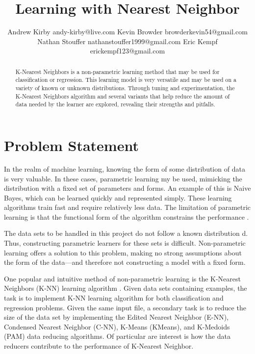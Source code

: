 \documentclass[twoside,11pt]{article}
\begin{document}
\title{Learning with Nearest Neighbor}

\author{\name Andrew Kirby \email andy-kirby@live.com \AND
		\name Kevin Browder \email browderkevin54@gmail.com \AND
		\name Nathan Stouffer \email nathanstouffer1999@gmail.com \AND
		\name Eric Kempf \email erickempf123@gmail.com }

\maketitle

\begin{abstract}
	K-Nearest Neighbors is a non-parametric learning method that may be used for classification or regression. This learning model is very versatile and may be used on a variety of known or unknown distributions. Through tuning and experimentation, the K-Nearest Neighbors algorithm and several variants that help reduce the amount of data needed by the learner are explored, revealing their strengths and pitfalls. 

\end{abstract}

\section{Problem Statement}

In the realm of machine learning, knowing the form of some distribution of data is very valuable. In these cases, parametric learning my be used, mimicking the distribution with a fixed set of parameters and forms. An example of this is Naive Bayes, which can be learned quickly and represented simply. These learning algorithms train fast and require relatively less data. The limitation of parametric learning is that the functional form of the algorithm constrains the performance \citep{distance-k-nn}.

The data sets to be handled in this project do not follow a known distribution \citep{datasets}d. Thus, constructing parametric learners for these sets is difficult. Non-parametric learning offers a solution to this problem, making no strong assumptions about the form of the data---and therefore not constructing a model with a fixed form.

One popular and intuitive method of non-parametric learning is the K-Nearest Neighbors (K-NN) learning algorithm \citep{NNClassificationOrigPaper}. Given data sets containing examples, the task is to implement K-NN learning algorithm for both classification and regression problems. Given the same input file, a secondary task is to reduce the size of the data set by implementing the Edited Nearest Neighbor (E-NN), Condensed Nearest Neighbor (C-NN), K-Means (KMeans), and K-Medoids (PAM) data reducing algorithms. Of particular are interest is how the data reducers contribute to the performance of K-Nearest Neighbor.
\end{document}
